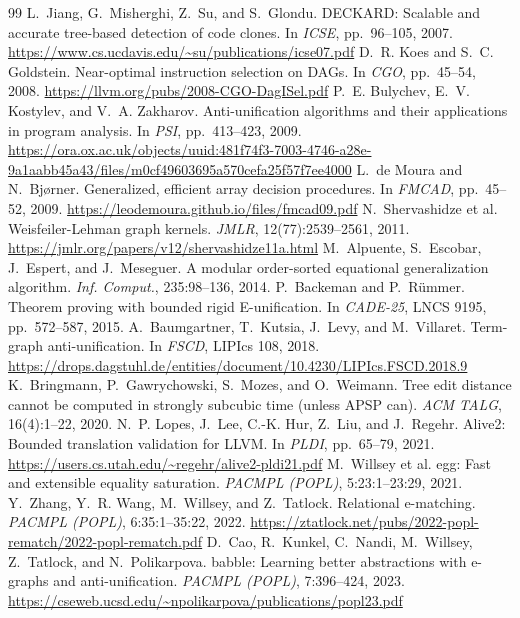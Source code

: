 \documentclass[11pt,a4paper]{article}
\begin{document}
\begin{thebibliography}{99}
 L.~Jiang, G.~Misherghi, Z.~Su, and S.~Glondu. DECKARD: Scalable and accurate tree-based detection of code clones. In \emph{ICSE}, pp.~96--105, 2007. \url{https://www.cs.ucdavis.edu/~su/publications/icse07.pdf}
 D.~R. Koes and S.~C. Goldstein. Near-optimal instruction selection on DAGs. In \emph{CGO}, pp.~45--54, 2008. \url{https://llvm.org/pubs/2008-CGO-DagISel.pdf}
 P.~E. Bulychev, E.~V. Kostylev, and V.~A. Zakharov. Anti-unification algorithms and their applications in program analysis. In \emph{PSI}, pp.~413--423, 2009. \url{https://ora.ox.ac.uk/objects/uuid:481f74f3-7003-4746-a28e-9a1aabb45a43/files/m0cf49603695a570cefa25f57f7ee4000}
 L.~de Moura and N.~Bj\o rner. Generalized, efficient array decision procedures. In \emph{FMCAD}, pp.~45--52, 2009. \url{https://leodemoura.github.io/files/fmcad09.pdf}
 N.~Shervashidze et al. Weisfeiler-Lehman graph kernels. \emph{JMLR}, 12(77):2539--2561, 2011. \url{https://jmlr.org/papers/v12/shervashidze11a.html}
 M.~Alpuente, S.~Escobar, J.~Espert, and J.~Meseguer. A modular order-sorted equational generalization algorithm. \emph{Inf. Comput.}, 235:98--136, 2014.
 P.~Backeman and P.~R\"ummer. Theorem proving with bounded rigid E-unification. In \emph{CADE-25}, LNCS 9195, pp.~572--587, 2015.
 A.~Baumgartner, T.~Kutsia, J.~Levy, and M.~Villaret. Term-graph anti-unification. In \emph{FSCD}, LIPIcs 108, 2018. \url{https://drops.dagstuhl.de/entities/document/10.4230/LIPIcs.FSCD.2018.9}
 K.~Bringmann, P.~Gawrychowski, S.~Mozes, and O.~Weimann. Tree edit distance cannot be computed in strongly subcubic time (unless APSP can). \emph{ACM TALG}, 16(4):1--22, 2020.
 N.~P. Lopes, J.~Lee, C.-K. Hur, Z.~Liu, and J.~Regehr. Alive2: Bounded translation validation for LLVM. In \emph{PLDI}, pp.~65--79, 2021. \url{https://users.cs.utah.edu/~regehr/alive2-pldi21.pdf}
 M.~Willsey et al. egg: Fast and extensible equality saturation. \emph{PACMPL (POPL)}, 5:23:1--23:29, 2021.
 Y.~Zhang, Y.~R. Wang, M.~Willsey, and Z.~Tatlock. Relational e-matching. \emph{PACMPL (POPL)}, 6:35:1--35:22, 2022. \url{https://ztatlock.net/pubs/2022-popl-rematch/2022-popl-rematch.pdf}
 D.~Cao, R.~Kunkel, C.~Nandi, M.~Willsey, Z.~Tatlock, and N.~Polikarpova. babble: Learning better abstractions with e-graphs and anti-unification. \emph{PACMPL (POPL)}, 7:396--424, 2023. \url{https://cseweb.ucsd.edu/~npolikarpova/publications/popl23.pdf}

\end{thebibliography}
\end{document}
